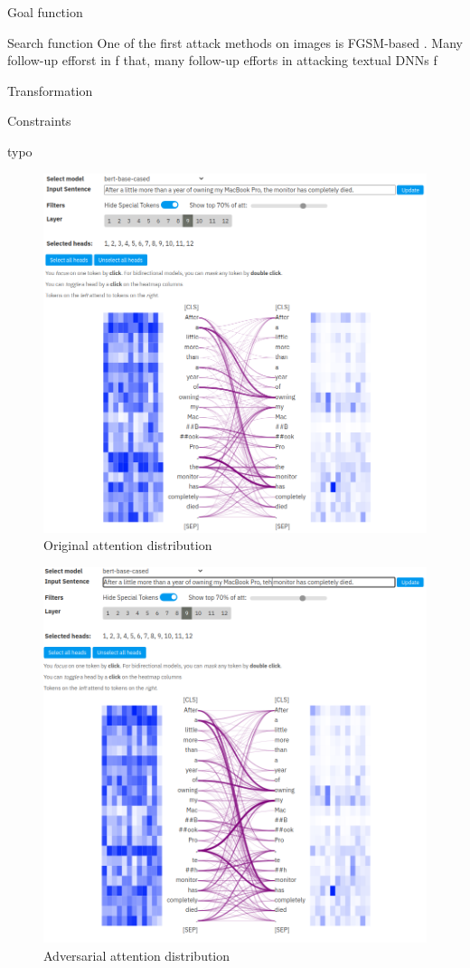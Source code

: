 Goal function

Search function
One of the first attack methods on images is FGSM-based \cite{??}. Many follow-up efforst in f that, many follow-up efforts in attacking textual DNNs f

\cite{li2018textbugger}


Transformation

Constraints



typo


\begin{figure}
    \centering
    \includegraphics[width =.8\textwidth]{img/attention_typo_originalpng.png}
    \caption{Original attention distribution}
    \label{fig:attention_typo_original}
\end{figure}

\begin{figure}
    \centering
    \includegraphics[width =.8\textwidth]{img/attention_typo_modified.png}
    \caption{Adversarial attention distribution}
    \label{fig:attention_typo_modified}
\end{figure}

